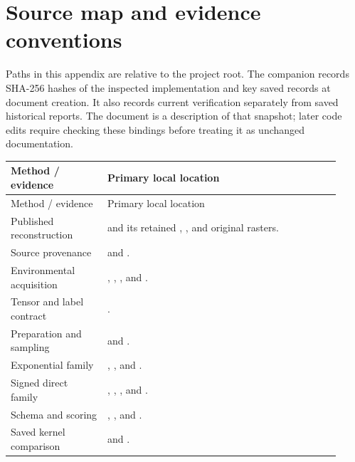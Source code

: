 \documentclass[11pt,a4paper]{article}
\begin{document}
\section{Source map and evidence conventions}
\label{app:sources}
Paths in this appendix are relative to the project root. The companion
 records SHA-256 hashes of
the inspected implementation and key saved records at document creation.
It also records current verification separately from saved historical reports.
The document is a description of that snapshot; later code edits require
checking these bindings before treating it as unchanged documentation.
\begin{longtable}{@{}P{0.27\linewidth}P{0.65\linewidth}@{}}
\toprule Method / evidence & Primary local location\\\midrule
\endfirsthead
\toprule Method / evidence & Primary local location\\\midrule
\endhead
Published reconstruction &  and its retained , , and original rasters.\\
Source provenance &  and .\\
Environmental acquisition & , , , and .\\
Tensor and label contract & .\\
Preparation and sampling &  and .\\
Exponential family & , , and .\\
Signed direct family & , , , and .\\
Schema and scoring & , , and .\\
Saved kernel comparison &  and .\\

\end{longtable}
\end{document}
